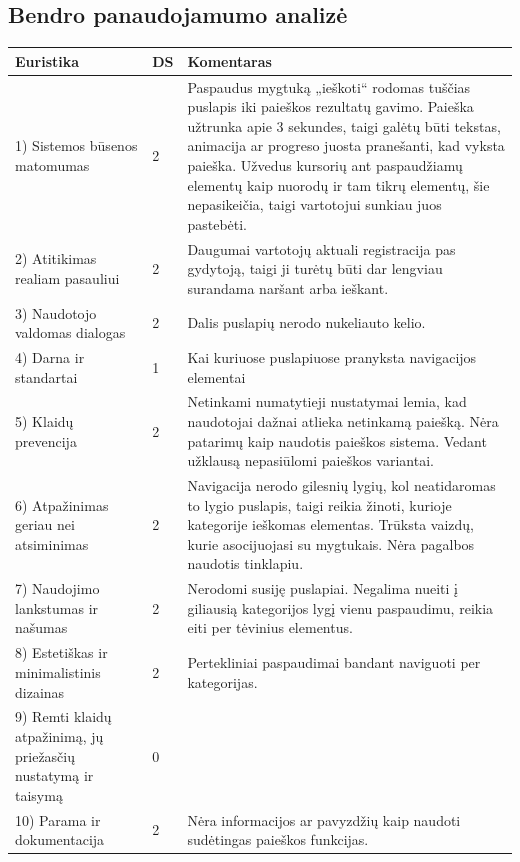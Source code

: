 \documentclass{VUMIFPSkursinis}
\begin{document}
\subsection{Bendro panaudojamumo analizė}

\begin{center}
\begin{tabular}{ | p{4cm} | p{} | p{11cm} | } 
 \hline
	Euristika & DS & Komentaras \\ \hline
	1) Sistemos būsenos matomumas & 2 & Paspaudus mygtuką „ieškoti“ rodomas tuščias puslapis iki paieškos rezultatų gavimo. Paieška užtrunka apie 3 sekundes, taigi galėtų būti tekstas, animacija ar progreso juosta pranešanti, kad vyksta paieška. Užvedus kursorių ant paspaudžiamų elementų kaip nuorodų ir tam tikrų elementų, šie nepasikeičia, taigi vartotojui sunkiau juos pastebėti. \\ \hline
	2) Atitikimas realiam pasauliui  & 2 & Daugumai vartotojų aktuali registracija pas gydytoją, taigi ji turėtų būti dar lengviau surandama naršant arba ieškant. \\ \hline
	3) Naudotojo valdomas dialogas & 2 & Dalis puslapių nerodo nukeliauto kelio. \\ \hline
	4) Darna ir standartai & 1 & Kai kuriuose puslapiuose pranyksta navigacijos elementai \\ \hline
	5) Klaidų prevencija & 2 & Netinkami numatytieji nustatymai lemia, kad naudotojai dažnai atlieka netinkamą paiešką. Nėra patarimų kaip naudotis paieškos sistema. Vedant užklausą nepasiūlomi paieškos variantai. \\ \hline
	6) Atpažinimas geriau nei atsiminimas & 2 & Navigacija nerodo gilesnių lygių, kol neatidaromas to lygio puslapis, taigi reikia žinoti, kurioje kategorije ieškomas elementas. Trūksta vaizdų, kurie asocijuojasi su mygtukais. Nėra pagalbos naudotis tinklapiu. \\ \hline
	7) Naudojimo lankstumas ir našumas & 2 & Nerodomi susiję puslapiai. Negalima nueiti į giliausią kategorijos lygį vienu paspaudimu, reikia eiti per tėvinius elementus. \\ \hline
	8) Estetiškas ir minimalistinis dizainas & 2 & Pertekliniai paspaudimai bandant naviguoti per kategorijas. \\ \hline
	9) Remti klaidų atpažinimą, jų priežasčių nustatymą ir taisymą & 0 &  \\ \hline
	10) Parama ir dokumentacija & 2 & Nėra informacijos ar pavyzdžių kaip naudoti sudėtingas paieškos funkcijas. \\ \hline
\end{tabular}
\label{EuristikųLentelėPrad}
\end{center}
\end{document}
